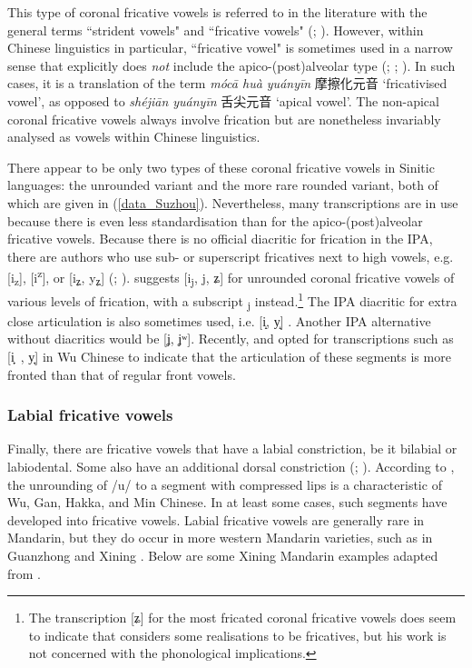 \documentclass[output=paper,colorlinks,citecolor=brown,chinesefont]{langscibook}
\begin{document}
This type of coronal fricative vowels is referred to in the literature with the general terms ``strident vowels" and ``fricative vowels" (\cite{Ladefoged&Maddieson_1990}; \cite{Hu&Ling_2019}). However, within Chinese linguistics in particular, ``fricative vowel" is sometimes used in a narrow sense that explicitly does \textit{not} include the apico-(post)alveolar type (\cite{Ling_2007}; \cite{Hu&Ling_2019}; \cite{Faytak_2022}). In such cases, it is a translation of the term \textit{mócā huà yuányīn} {\cn 摩擦化元音} `fricativised vowel', as opposed to \textit{shéjiān yuányīn} {\cn 舌尖元音} `apical vowel'. The non-apical coronal fricative vowels always involve frication but are nonetheless invariably analysed as vowels within Chinese linguistics.

There appear to be only two types of these coronal fricative vowels in Sinitic languages: the unrounded variant and the more rare rounded variant, both of which are given in (\ref{data_Suzhou}). Nevertheless, many transcriptions are in use because there is even less standardisation than for the apico-(post)alveolar fricative vowels. Because there is no official diacritic for frication in the IPA, there are authors who use sub- or superscript fricatives next to high vowels, e.g. [i\textsubscript{z}], [i\textsuperscript{z}], or  [i\textsubscript{ʑ}, y\textsubscript{ʑ}] (\cite{Ling_2007}; \cite{Faytak_2019}). \citet{Wu_2013} suggests [i\textsubscript{j}, j, ʑ] for unrounded coronal fricative vowels of various levels of frication, with a subscript \textsubscript{j} instead.\footnote{The transcription [ʑ] for the most fricated coronal fricative vowels does seem to indicate that \citet{Wu_2013} considers some realisations to be fricatives, but his work is not concerned with the phonological implications.} The IPA diacritic for extra close articulation is also sometimes used, i.e. [i̝, y̝] \citep{Hu&Ling_2019}. Another IPA alternative without diacritics would be [ʝ, ʝʷ]. Recently, \citet{VandeWeijer&al_2021} and \citet{Shi&Chen_2022} opted for transcriptions such as \mbox{[i̟ ,} y̟] in Wu Chinese to indicate that the articulation of these segments is more fronted than that of regular front vowels.

\subsubsection{Labial fricative vowels} \label{labial.fvs}
Finally, there are fricative vowels that have a labial constriction, be it bilabial or labiodental. Some also have an additional dorsal constriction (\cite{Hu&He_2019}; \cite[48]{shao_2020}). According to \citet[258]{Pan_1991}, the unrounding of /u/ to a segment with compressed lips is a characteristic of Wu, Gan, Hakka, and Min Chinese. In at least some cases, such segments have developed into fricative vowels. Labial fricative vowels are generally rare in Mandarin, but they do occur in more western Mandarin varieties, such as in Guanzhong \citep{Zhang_and_Xing_2011} and Xining \citep{Dede_2006}. Below are some Xining Mandarin examples adapted from \citet[324]{Dede_2006}.
\end{document}
